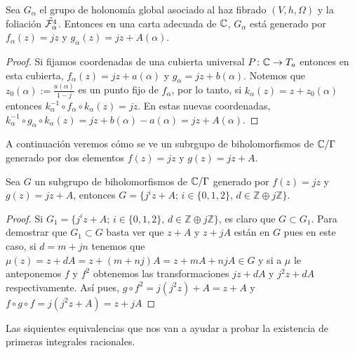 \begin{Lema}
\label{Lema:GrupoHolonomia}
Sea $G_{\alpha}$ el grupo de holonomía global asociado al haz fibrado $(V,h,\Omega)$ y la foliación $\tilde{\mathcal{F}_{\alpha}^{4}}$. Entonces en una carta adecuada de $\mathbb{C}$, $G_{\alpha}$ está generado por $f_{\alpha}(z)=jz$ y $g_{\alpha}(z)=jz+A(\alpha)$.
\end{Lema}
\begin{proof}
Si fijamos coordenadas de una cubierta universal $P\colon \mathbb{C}\rightarrow T_{a}$ entonces en esta cubierta, $f_{\alpha}(z)=jz+a(\alpha)$ y $g_{\alpha}=jz+b(\alpha)$. Notemos que $z_{0}(\alpha):=\tfrac{a(\alpha)}{1-j}$ es un punto fijo de $f_{\alpha}$, por lo tanto, si $k_{\alpha}(z)=z+z_{0}(\alpha)$ entonces $k_{\alpha}^{-1}\circ f_{\alpha}\circ k_{\alpha}(z)=jz$. En estas nuevas coordenadas, $k_{\alpha}^{-1}\circ g_{\alpha}\circ k_{\alpha}(z)=jz+b(\alpha)-a(\alpha)=jz+A(\alpha)$. 
\end{proof}

A continuación veremos cómo se ve un subrgupo de biholomorfismos de $\mathbb{C}/\Gamma$ generado por dos elementos $f(z)=jz$ y $g(z)=jz+A$.

\begin{Proposicion}
\label{Prop:DescripcionDelGrupo}
Sea $G$ un subgrupo de biholomorfismos de $\mathbb{C}/\Gamma$ generado por $f(z)=jz$ y $g(z)=jz+A$, entonces $G=\{j^{i}z+A;\, i\in\{0,1,2\},\, d\in\mathbb{Z}\oplus j\mathbb{Z} \}$.
\end{Proposicion}
\begin{proof}
Si $G_{1}=\{j^{i}z+A;\, i\in\{0,1,2\},\, d\in\mathbb{Z}\oplus j\mathbb{Z} \}$, es claro que $G\subset G_{1}$. Para demostrar que $G_{1}\subset G$ basta ver que $z+A$ y $z+jA$ están en $G$ pues en este caso, si $d=m+jn$ tenemos que $\mu(z)=z+dA=z+(m+nj)A=z+mA+njA\in G$ y si a $\mu$ le anteponemos $f$ y $f^{2}$ obtenemos las transformaciones $jz+dA$ y $j^{2}z+dA$ respectivamente. Así pues, $g\circ f^{2}=j(j^{2}z)+A=z+A$ y $f\circ g\circ f=j(j^{2}z+A)=z+jA$
\end{proof}

Las siquientes equivalencias que nos van a ayudar a probar la existencia de primeras integrales racionales.

